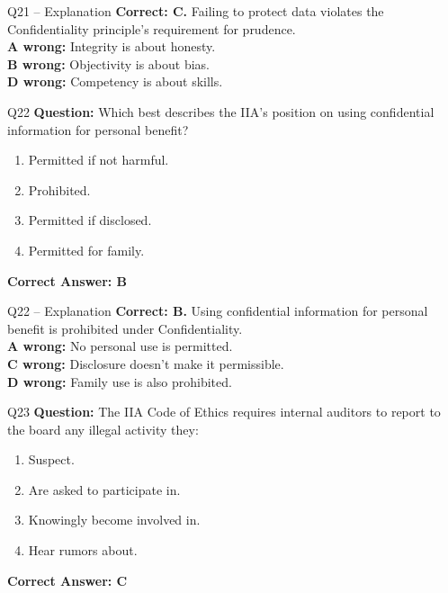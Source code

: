 \documentclass[aspectratio=169,10pt]{beamer}
\begin{document}
	\begin{frame}[t]{Q21 -- Explanation}
		\small
		\textbf{Correct: C.} Failing to protect data violates the Confidentiality principle's requirement for prudence. \\[4pt]
		\textbf{A wrong:} Integrity is about honesty. \\[2pt]
		\textbf{B wrong:} Objectivity is about bias. \\[2pt]
		\textbf{D wrong:} Competency is about skills.
	\end{frame}
	
	\begin{frame}[t]{Q22}
		\small
		\textbf{Question:} Which best describes the IIA's position on using confidential information for personal benefit?
		\begin{enumerate}[label=\Alph*.,itemsep=1pt,topsep=2pt]
			\item Permitted if not harmful.
			\item Prohibited.
			\item Permitted if disclosed.
			\item Permitted for family.
		\end{enumerate}
		\vspace{4pt}
		\textbf{Correct Answer: B}
	\end{frame}
	
	\begin{frame}[t]{Q22 -- Explanation}
		\small
		\textbf{Correct: B.} Using confidential information for personal benefit is prohibited under Confidentiality. \\[4pt]
		\textbf{A wrong:} No personal use is permitted. \\[2pt]
		\textbf{C wrong:} Disclosure doesn't make it permissible. \\[2pt]
		\textbf{D wrong:} Family use is also prohibited.
	\end{frame}
	
	\begin{frame}[t]{Q23}
		\small
		\textbf{Question:} The IIA Code of Ethics requires internal auditors to report to the board any illegal activity they:
		\begin{enumerate}[label=\Alph*.,itemsep=1pt,topsep=2pt]
			\item Suspect.
			\item Are asked to participate in.
			\item Knowingly become involved in.
			\item Hear rumors about.
		\end{enumerate}
		\vspace{4pt}
		\textbf{Correct Answer: C}
	\end{frame}
	
\end{document}
